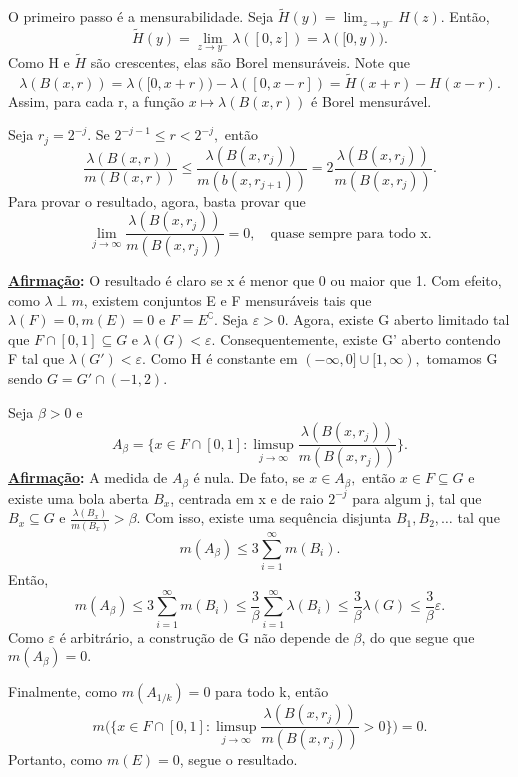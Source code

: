 \documentclass[MeasureTheory/measure_theory.tex]{subfiles}
\begin{document}
\begin{proof*}
	O primeiro passo é a mensurabilidade. Seja \(\tilde{H}(y) = \lim_{z\to y^{-}}H(z).\) Então,
	\[
		\tilde{H}(y) = \lim_{z\to y^{-}}\lambda ([0, z])=\lambda ([0, y)).
	\]
	Como H e \(\tilde{H}\) são crescentes, elas são Borel mensuráveis. Note que
	\[
		\lambda (B(x, r)) = \lambda ([0, x + r)) - \lambda ([0, x - r]) = \tilde{H}(x+r) - H(x-r).
	\]
	Assim, para cada r, a função \(x\mapsto \lambda (B(x, r))\) é Borel mensurável.

	Seja \(r_{j} = 2^{-j}.\) Se \(2^{-j-1}\leq r < 2^{-j}, \) então
	\[
		\frac{\lambda (B(x, r))}{m(B(x, r))} \leq \frac{\lambda (B(x, r_{j}))}{m(b(x, r_{j+1}))} = 2 \frac{\lambda (B(x, r_{j}))}{m(B(x, r_{j}))}.
	\]
	Para provar o resultado, agora, basta provar que
	\[
		\lim_{j\to \infty}\frac{\lambda (B(x, r_{j}))}{m(B(x, r_{j}))} = 0,\quad \text{quase sempre para todo x.}
	\]

	\textbf{\underline{Afirmação}:} O resultado é claro se x é menor que 0 ou maior que 1.
	Com efeito, como \(\lambda \perp m\), existem conjuntos E e F mensuráveis tais que \(\lambda (F) = 0, m(E) = 0\) e \(F = E ^{\complement}.\) Seja \(\varepsilon > 0\). Agora, existe G aberto limitado tal que \(F\cap [0, 1]\subseteq G\) e \(\lambda (G) < \varepsilon .\)
	Consequentemente, existe G' aberto contendo F tal que \(\lambda (G') < \varepsilon .\) Como H é constante em \((-\infty, 0]\cup [1, \infty),\) tomamos G sendo \(G = G'\cap (-1, 2)\).

	Seja \(\beta  > 0\) e
	\[
		A_{\beta } = \biggl\{x\in F\cap [0, 1]: \limsup_{j\to \infty}\frac{\lambda (B(x, r_{j}))}{m(B(x, r_{j}))}\biggr\}.
	\]
	\textbf{\underline{Afirmação}:} A medida de \(A_{\beta }\) é nula. De fato, se \(x\in A_{\beta },\) então \(x\in F\subseteq G\) e existe uma bola aberta \(B_{x}\), centrada em x e de raio \(2^{-j}\) para algum j, tal que \(B_{x}\subseteq G\) e \(\frac{\lambda (B_x)}{m(B_x)}>\beta .\)
	Com isso, existe uma sequência disjunta \(B_1, B_2, \dotsc \) tal que
	\[
		m(A_{\beta }) \leq 3\sum\limits_{i=1}^{\infty}m(B_{i}).
	\]
	Então,
	\[
		m(A_{\beta }) \leq 3\sum\limits_{i=1}^{\infty}m(B_{i}) \leq \frac{3}{\beta }\sum\limits_{i=1}^{\infty}\lambda (B_{i}) \leq \frac{3}{\beta }\lambda (G) \leq \frac{3}{\beta }\varepsilon .
	\]
	Como \(\varepsilon \) é arbitrário, a construção de G não depende de \(\beta \), do que segue que \(m(A_{\beta }) = 0.\)

	Finalmente, como \(m(A_{1/k}) = 0\) para todo k, então
	\[
		m \biggl(\biggl\{x\in F\cap [0, 1]: \limsup_{j\to \infty}\frac{\lambda (B(x, r_{j}))}{m(B(x, r_{j}))} > 0\biggr\}\biggr) = 0.
	\]
	Portanto, como \(m(E) = 0\), segue o resultado. \qedsymbol
\end{proof*}
\end{document}
